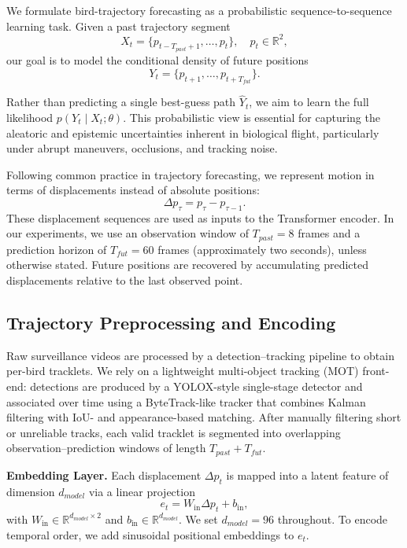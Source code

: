 \documentclass[journal]{IEEEtran}
\begin{document}
We formulate bird-trajectory forecasting as a probabilistic sequence-to-sequence learning task. Given a past trajectory segment
\[
X_t = \{p_{t-T_{past}+1}, \ldots, p_t\}, \quad p_t \in \mathbb{R}^2,
\]
our goal is to model the conditional density of future positions
\[
Y_t = \{p_{t+1}, \ldots, p_{t+T_{fut}}\}.
\]

Rather than predicting a single best-guess path $\hat{Y}_t$, we aim to learn the full likelihood $p(Y_t \mid X_t; \theta)$. This probabilistic view is essential for capturing the aleatoric and epistemic uncertainties inherent in biological flight, particularly under abrupt maneuvers, occlusions, and tracking noise.

Following common practice in trajectory forecasting, we represent motion in terms of displacements instead of absolute positions:
\[
\Delta p_\tau = p_\tau - p_{\tau-1}.
\]
These displacement sequences are used as inputs to the Transformer encoder. In our experiments, we use an observation window of $T_{past}=8$ frames and a prediction horizon of $T_{fut}=60$ frames (approximately two seconds), unless otherwise stated. Future positions are recovered by accumulating predicted displacements relative to the last observed point.

\subsection{Trajectory Preprocessing and Encoding}

Raw surveillance videos are processed by a detection--tracking pipeline to obtain per-bird tracklets. We rely on a lightweight multi-object tracking (MOT) front-end: detections are produced by a YOLOX-style single-stage detector and associated over time using a ByteTrack-like tracker that combines Kalman filtering with IoU- and appearance-based matching. After manually filtering short or unreliable tracks, each valid tracklet is segmented into overlapping observation--prediction windows of length $T_{past} + T_{fut}$.

\textbf{Embedding Layer.}
Each displacement $\Delta p_t$ is mapped into a latent feature of dimension $d_{model}$ via a linear projection
\[
e_t = W_{\text{in}} \Delta p_t + b_{\text{in}},
\]
with $W_{\text{in}} \in \mathbb{R}^{d_{model} \times 2}$ and $b_{\text{in}} \in \mathbb{R}^{d_{model}}$. We set $d_{model}=96$ throughout. To encode temporal order, we add sinusoidal positional embeddings to $e_t$.
\end{document}
